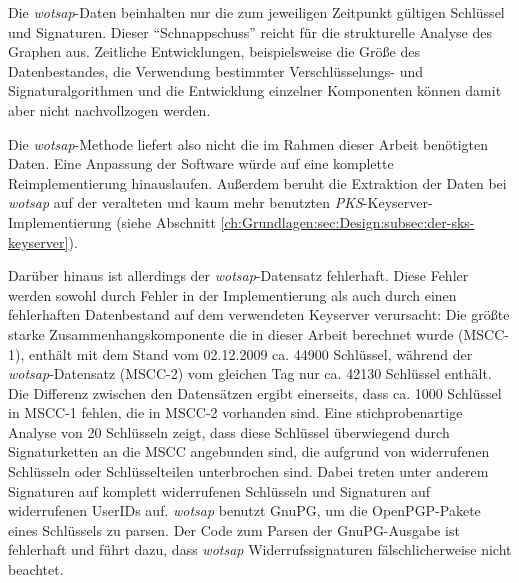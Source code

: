 Die \emph{wotsap}-Daten beinhalten nur die zum jeweiligen Zeitpunkt
gültigen Schlüssel und Signaturen. Dieser "`Schnappschuss"' reicht für
die strukturelle Analyse des Graphen aus. Zeitliche Entwicklungen,
beispielsweise die Größe des Datenbestandes, die Verwendung
bestimmter Verschlüsselungs- und Signaturalgorithmen und die Entwicklung
einzelner Komponenten können damit aber nicht nachvollzogen werden.

Die \emph{wotsap}-Methode liefert also nicht die im Rahmen dieser
Arbeit benötigten Daten. Eine Anpassung der Software würde auf eine
komplette Reimplementierung hinauslaufen. Außerdem beruht die
Extraktion der Daten bei \emph{wotsap} auf der veralteten und kaum
mehr benutzten \emph{PKS}-Keyserver-Implementierung (siehe Abschnitt
\ref{ch:Grundlagen:sec:Design:subsec:der-sks-keyserver}).

Darüber hinaus ist allerdings der \emph{wotsap}-Datensatz
fehlerhaft. Diese Fehler werden sowohl durch Fehler in der
Implementierung als auch durch einen fehlerhaften Datenbestand auf dem
verwendeten Keyserver verursacht: Die größte starke
Zusammenhangskomponente die in dieser Arbeit berechnet wurde (MSCC-1),
enthält mit dem Stand vom 02.12.2009 ca. 44900 Schlüssel, während der
\emph{wotsap}-Datensatz (MSCC-2) vom gleichen Tag nur ca. 42130
Schlüssel enthält. Die Differenz zwischen den Datensätzen ergibt
einerseits, dass ca. 1000 Schlüssel in MSCC-1 fehlen, die in MSCC-2
vorhanden sind. Eine stichprobenartige Analyse von 20 Schlüsseln
zeigt, dass diese Schlüssel überwiegend durch Signaturketten an die
MSCC angebunden sind, die aufgrund von widerrufenen Schlüsseln oder
Schlüsselteilen unterbrochen sind. Dabei treten unter anderem
Signaturen auf komplett widerrufenen Schlüsseln und Signaturen auf
widerrufenen UserIDs auf. \emph{wotsap} benutzt GnuPG, um die
OpenPGP-Pakete eines Schlüssels zu parsen. Der Code zum Parsen der
GnuPG-Ausgabe ist fehlerhaft und führt dazu, dass \emph{wotsap}
Widerrufssignaturen fälschlicherweise nicht beachtet.


